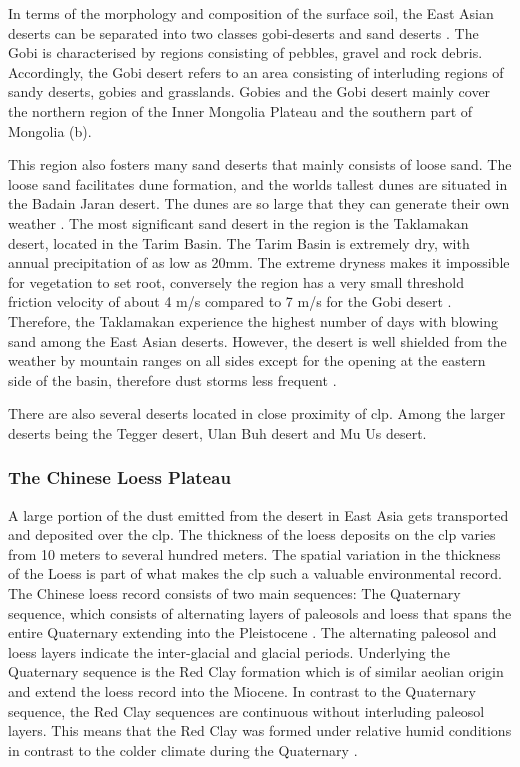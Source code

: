 In terms of the morphology and composition of the surface soil, the East Asian deserts can be separated into two classes gobi-deserts and sand deserts \parencite{xuan2002characterization}. The Gobi is characterised by regions consisting of pebbles, gravel and rock debris. Accordingly, the Gobi desert refers to an area consisting of interluding regions of sandy deserts, gobies and grasslands.
Gobies and the Gobi desert mainly cover the northern region of the Inner Mongolia Plateau and the southern part of Mongolia (b). 

This region also fosters many sand deserts that mainly consists of loose sand. The loose sand facilitates dune formation, and the worlds tallest dunes are situated in the Badain Jaran desert. 
The dunes are so large that they can generate their own weather \parencite{dong2013investigation}. The most significant sand desert in the region is the Taklamakan desert, located in the Tarim Basin. 
The Tarim Basin is extremely dry, with annual precipitation of as low as 20mm. The extreme dryness makes it impossible for vegetation to set root, conversely the region has a very small threshold friction velocity of about 4 m/s compared to 7 m/s for the Gobi desert \parencite{ShaoYaping2008PaMo}. Therefore, the Taklamakan experience the highest number of days with blowing sand among the East Asian deserts. However, the desert is well shielded from the weather by mountain ranges on all sides except for the opening at the eastern side of the basin, therefore dust storms less frequent \parencite{ShaoYaping2008PaMo}. 

There are also several deserts located in close proximity of \acrshort{clp}. Among the larger deserts being the Tegger desert, Ulan Buh desert and Mu Us desert. 

\subsubsection{The Chinese Loess Plateau}
A large portion of the dust emitted from the desert in East Asia gets transported and deposited over the \acrshort{clp}. 
The thickness of the loess deposits on the \acrshort{clp} varies from 10 meters to several hundred meters. 
The spatial variation in the thickness of the Loess is part of what makes the \acrshort{clp} such a valuable environmental record.  The Chinese loess record consists of two main sequences: The Quaternary sequence, which consists of alternating layers of paleosols and loess that spans the entire Quaternary extending into the Pleistocene \parencite{maher2016palaeoclimatic}. The alternating paleosol and loess layers indicate the inter-glacial and glacial periods.  Underlying the Quaternary sequence is the Red Clay formation which is of similar aeolian origin and extend the loess record into the Miocene. In contrast to the Quaternary sequence, the Red Clay sequences are continuous without interluding paleosol layers. This means that the Red Clay was formed under relative humid conditions in contrast to the colder climate during the Quaternary \parencite{yang2004comparison}. 

